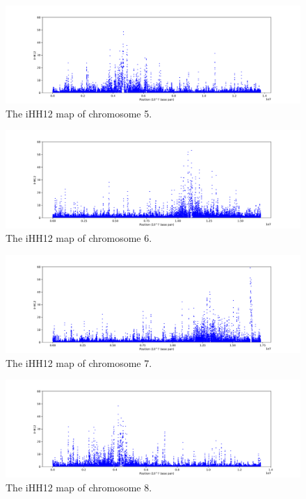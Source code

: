 \begin{figure}[h!]
    \centering
    \includegraphics[scale=0.4]{figs/Appx13.png}
    \caption{The iHH12 map of chromosome 5.}
    \label{fig:18}
\end{figure}

\begin{figure}[h!]
    \centering
    \includegraphics[scale=0.4]{figs/Appx14.png}
    \caption{The iHH12 map of chromosome 6.}
    \label{fig:19}
\end{figure}

\begin{figure}[h!]
    \centering
    \includegraphics[scale=0.4]{figs/Appx15.png}
    \caption{The iHH12 map of chromosome 7.}
    \label{fig:20}
\end{figure}

\begin{figure}[h!]
    \centering
    \includegraphics[scale=0.4]{figs/Appx16.png}
    \caption{The iHH12 map of chromosome 8.}
    \label{fig:21}
\end{figure}